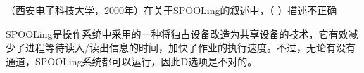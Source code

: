 \question （西安电子科技大学，2000年）在关于SPOOLing的叙述中，（ ）描述不正确
\par{}
\begin{solution}SPOOLing是操作系统中采用的一种将独占设备改造为共享设备的技术，它有效减少了进程等待读入/读出信息的时间，加快了作业的执行速度。不过，无论有没有通道，SPOOLing系统都可以运行，因此D选项是不对的。
\end{solution}
